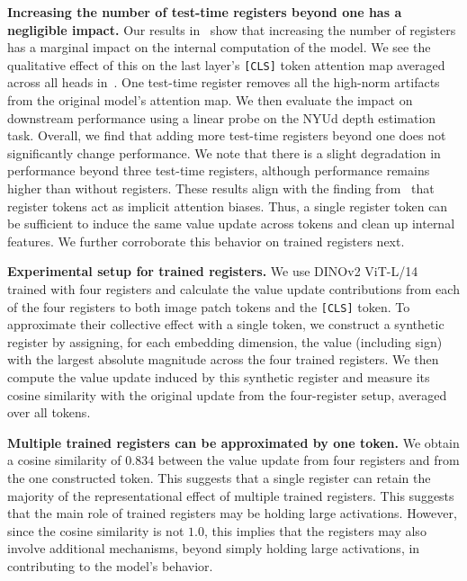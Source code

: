\documentclass{article}
\begin{document}
\textbf{Increasing the number of test-time registers beyond one has a negligible impact.} Our results in~ show that increasing the number of registers has a marginal impact on the internal computation of the model. We see the qualitative effect of this on the last layer's \texttt{[CLS]} token attention map averaged across all heads in~. One test-time register removes all the high-norm artifacts from the original model's attention map. We then evaluate the impact on downstream performance using a linear probe on the NYUd depth estimation task. Overall, we find that adding more test-time registers beyond one does not significantly change performance. We note that there is a slight degradation in performance beyond three test-time registers, although performance remains higher than without registers. These results align with the finding from~\cite{sunmassive} that register tokens act as implicit attention biases. Thus, a single register token can be sufficient to induce the same value update across tokens and clean up internal features. We further corroborate this behavior on trained registers next.

\textbf{Experimental setup for trained registers.} We use DINOv2 ViT-L/14 trained with four registers and calculate the value update contributions from each of the four registers to both image patch tokens and the \texttt{[CLS]} token. To approximate their collective effect with a single token, we construct a synthetic register by assigning, for each embedding dimension, the value (including sign) with the largest absolute magnitude across the four trained registers. We then compute the value update induced by this synthetic register and measure its cosine similarity with the original update from the four-register setup, averaged over all tokens. 

\textbf{Multiple trained registers can be approximated by one token.} We obtain a cosine similarity of $0.834$ between the value update from four registers and from the one constructed token. This suggests that a single register can retain the majority of the representational effect of multiple trained registers. This suggests that the main role of trained registers may be holding large activations. However, since the cosine similarity is not $1.0$, this implies that the registers may also involve additional mechanisms, beyond simply holding large activations, in contributing to the model's behavior.
\end{document}
